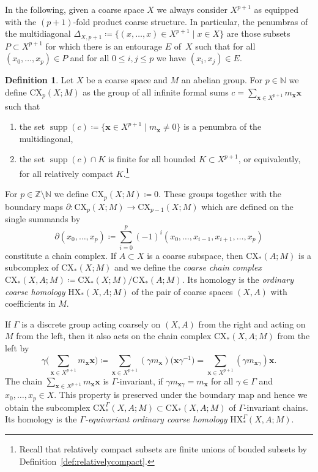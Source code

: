 \documentclass[pdftex]{sigma}
\numberwithin{equation}{section}
\theoremstyle{definition}
\newtheorem{defn}[thm]{Definition}
\newcommand{\N}{\mathbb{N}}
\newcommand{\Z}{\mathbb{Z}}
\newcommand{\Diag}[1][]{{\Delta_{#1}}}
\DeclareMathOperator{\supp}{supp}
\newcommand{\HX}{\mathrm{HX}}
\newcommand{\CX}{\mathrm{CX}}
\begin{document}
In the following, given a coarse space $X$ we always consider $X^{p+1}$ as equipped with the $(p+1)$-fold product coarse structure. In particular, the penumbras of the multidiagonal \(\Diag[X,p+1]\coloneqq\big\{(x,\dots,x)\in X^{p+1} \mid x\in X\big\}\) are those subsets $P\subset X^{p+1}$ for which there is an entourage $E$ of~$X$ such that for all $(x_0,\dots,x_p)\in P$ and for all $0\leq i,j\leq p$ we have $(x_i,x_j)\in E$.


\begin{defn}
Let $X$ be a coarse space and $M$ an abelian group. For $p\in\N$ we define $\CX_p(X;M)$ as the group of all infinite formal sums $c=\sum_{\mathbf{x}\in X^{p+1}}m_{\mathbf{x}}\mathbf{x}$ such that
\begin{enumerate}\itemsep=0pt
\item[$\bullet$] the set $\supp(c)\coloneqq\big\{\mathbf{x}\in X^{p+1}\mid m_{\mathbf{x}}\not=0\big\}$ is a penumbra of the multidiagonal,
\item[$\bullet$] the set $\supp(c)\cap K$ is finite for all bounded $K\subset X^{p+1}$, or equivalently, for all relatively compact $K$.\footnote{Recall that relatively compact subsets are finite unions of bouded subsets by Definition~\ref{def:relativelycompact}.}
\end{enumerate}
For $p\in\Z\setminus\N$ we define $\CX_p(X;M)\coloneqq 0$. These groups together with the boundary maps
$\partial\colon\CX_{p}(X;M)\to\CX_{p-1}(X;M)$ which are defined on the single summands by
\[
\partial(x_0,\dots,x_p)\coloneqq \sum_{i=0}^p(-1)^i(x_0,\dots,x_{i-1},x_{i+1},\dots,x_p)
\]
constitute a chain complex.
If $A\subset X$ is a coarse subspace, then $\CX_*(A;M)$ is a subcomplex of $\CX_*(X;M)$ and we define the \emph{coarse chain complex} $\CX_*(X,A;M)\coloneqq \CX_*(X;M)/\CX_*(A;M)$. Its homology is the \emph{ordinary coarse homology} $\HX_*(X,A;M)$ of the pair of coarse spaces $(X,A)$ with coefficients in $M$.

If $\Gamma$ is a discrete group acting coarsely on $(X,A)$ from the right and acting on $M$ from the left, then it also acts on the chain complex $\CX_*(X,A;M)$ from the left by
\[
\gamma\bigg(\sum_{\mathbf{x}\in X^{p+1}}m_{\mathbf{x}}\mathbf{x}\bigg)\coloneqq\sum_{\mathbf{x}\in X^{p+1}}( \gamma m_{\mathbf{x}})\big(\mathbf{x}\gamma^{-1}\big)=\sum_{\mathbf{x}\in X^{p+1}}(\gamma m_{\mathbf{x}\gamma})\mathbf{x}.
\]
The chain $\sum_{\mathbf{x}\in X^{p+1}}m_{\mathbf{x}}\mathbf{x}$ is $\Gamma$-invariant, if $\gamma m_{\mathbf{x}\gamma}=m_{\mathbf{x}}$ for all $\gamma\in\Gamma$ and $x_0,\dots,x_p\in X$.
This property is preserved under the boundary map and hence we obtain the subcomplex $\CX^\Gamma_*(X,A;M)\subset \CX_*(X,A;M)$ of $\Gamma$-invariant chains. Its homology is the \emph{$\Gamma$-equivariant ordinary coarse homology} $\HX^\Gamma_*(X,A;M)$.
\end{defn}
\end{document}
